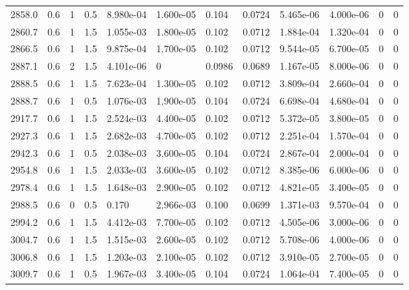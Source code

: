 \documentclass[preview]{standalone}
\begin{document}
{{{\begin{tabular}{L{1.2cm}C{1.2cm} C{0.3cm}C{0.5cm} C{1.4cm}C{1.4cm} C{1.4cm}C{1.4cm} C{1.6cm}C{1.6cm} C{1.6cm}C{1.6cm}}
  2858.0  &   0.6  & 1     & 0.5 &  8.980e-04  & 1.600e-05  &  0.104&   0.0724& 5.465e-06 & 4.000e-06   &  0 & 0  \\ 
  2860.7  &   0.6  & 1     & 1.5 &  1.055e-03  & 1.800e-05  &  0.102&   0.0712& 1.884e-04 & 1.320e-04   &  0 & 0  \\ 
  2866.5  &   0.6  & 1     & 1.5 &  9.875e-04  & 1.700e-05  &  0.102&   0.0712& 9.544e-05 & 6.700e-05   &  0 & 0  \\ 
  2887.1  &   0.6  & 2     & 1.5 &  4.101e-06  & 0  &  0.0986&   0.0689& 1.167e-05 & 8.000e-06   &  0 & 0  \\ 
  2888.5  &   0.6  & 1     & 1.5 &  7.623e-04  & 1.300e-05  &  0.102&   0.0712& 3.809e-04 & 2.660e-04   &  0 & 0  \\ 
  2888.7  &   0.6  & 1     & 0.5 &  1.076e-03  & 1.900e-05  &  0.104&   0.0724& 6.698e-04 & 4.680e-04   &  0 & 0  \\ 
  2917.7  &   0.6  & 1     & 1.5 &  2.524e-03  & 4.400e-05  &  0.102&   0.0712& 5.372e-05 & 3.800e-05   &  0 & 0  \\ 
  2927.3  &   0.6  & 1     & 1.5 &  2.682e-03  & 4.700e-05  &  0.102&   0.0712& 2.251e-04 & 1.570e-04   &  0 & 0  \\ 
  2942.3  &   0.6  & 1     & 0.5 &  2.038e-03  & 3.600e-05  &  0.104&   0.0724& 2.867e-04 & 2.000e-04   &  0 & 0  \\ 
  2954.8  &   0.6  & 1     & 1.5 &  2.033e-03  & 3.600e-05  &  0.102&   0.0712& 8.385e-06 & 6.000e-06   &  0 & 0  \\ 
  2978.4  &   0.6  & 1     & 1.5 &  1.648e-03  & 2.900e-05  &  0.102&   0.0712& 4.821e-05 & 3.400e-05   &  0 & 0  \\ 
  2988.5  &   0.6  & 0     & 0.5 &  0.170  & 2.966e-03  &  0.100&   0.0699& 1.371e-03 & 9.570e-04   &  0 & 0  \\ 
  2994.2  &   0.6  & 1     & 1.5 &  4.412e-03  & 7.700e-05  &  0.102&   0.0712& 4.505e-06 & 3.000e-06   &  0 & 0  \\ 
  3004.7  &   0.6  & 1     & 1.5 &  1.515e-03  & 2.600e-05  &  0.102&   0.0712& 5.708e-06 & 4.000e-06   &  0 & 0  \\ 
  3006.8  &   0.6  & 1     & 1.5 &  1.203e-03  & 2.100e-05  &  0.102&   0.0712& 3.910e-05 & 2.700e-05   &  0 & 0  \\ 
  3009.7  &   0.6  & 1     & 0.5 &  1.967e-03  & 3.400e-05  &  0.104&   0.0724& 1.064e-04 & 7.400e-05   &  0 & 0  \\ 
\hline 
\end{tabular} 

}}}
\end{document}
